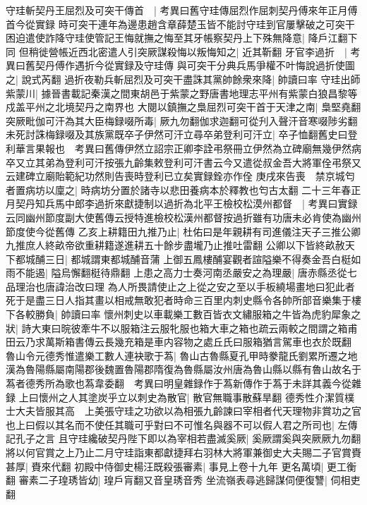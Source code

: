 守珪斬契丹王屈烈及可突干傳首　|{
	考異曰舊守珪傳屈烈作屈刺契丹傅來年正月傅首今從實録}
時可突干連年為邊患趙含章薛楚玉皆不能討守珪到官屢擊破之可突干困迫遣使詐降守珪使管記王悔就撫之悔至其牙帳察契丹上下殊無降意|{
	降戶江翻下同}
但稍徙營帳近西北密遣人引突厥謀殺悔以叛悔知之|{
	近其靳翻}
牙官李過折　|{
	考異曰舊契丹傅作遇折今從實録及守珪傳}
與可突干分典兵馬爭權不叶悔說過折使圖之|{
	說式芮翻}
過折夜勒兵斬屈烈及可突干盡誅其黨帥餘衆來降|{
	帥讀曰率}
守珪出師紫蒙川|{
	據晉書載記秦漢之間東胡邑于紫蒙之野唐書地理志平州有紫蒙白狼昌黎等戍盖平州之北境契丹之南界也}
大閱以鎮撫之梟屈烈可突干首于天津之南|{
	梟堅堯翻}
突厥毗伽可汗為其大臣梅録啜所毒|{
	厥九勿翻伽求迦翻可從刋入聲汗音寒啜陟劣翻}
未死討誅梅録啜及其族黨既卒子伊然可汗立尋卒弟登利可汗立|{
	卒子恤翻舊史曰登利華言果報也　考異曰舊傳伊然立詔宗正卿李詮弔祭冊立伊然為立碑廟無幾伊然病卒又立其弟為登利可汗按張九齡集敕登利可汗書云今又遣從叔金吾大將軍佺弔祭又云建碑立廟貽範紀功然則告喪時登利已立矣實録銓亦作佺}
庚戌來告喪　禁京城匄者置病坊以廩之|{
	時病坊分置於諸寺以悲田養病本於釋教也匄古太翻}
二十三年春正月契丹知兵馬中郎李過折來獻捷制以過折為北平王檢校松漠州都督　|{
	考異曰實録云同幽州節度副大使舊傳云授特進檢校松漢州都督按過折雖有功唐未必肯使為幽州節度使今從舊傳}
乙亥上耕籍田九推乃止|{
	杜佑曰是年親耕有司進儀注天子三推公卿九推庶人終畝帝欲重耕籍遂進耕五十餘步盡壠乃止推吐雷翻}
公卿以下皆終畝赦天下都城酺三日|{
	都城謂東都城酺音蒲}
上御五鳳樓酺宴觀者諠隘樂不得奏金吾白梃如雨不能遏|{
	隘烏懈翻梃待鼎翻}
上患之高力士奏河南丞嚴安之為理嚴|{
	唐赤縣丞從七品理治也唐諱治改曰理}
為人所畏請使止之上從之安之至以手板繞場畫地曰犯此者死于是盡三日人指其畫以相戒無敢犯者時命三百里内刺史縣令各帥所部音樂集于樓下各較勝負|{
	帥讀曰率}
懷州刺史以車載樂工數百皆衣文繡服箱之牛皆為虎豹犀象之狀|{
	詩大東曰晥彼牽牛不以服箱注云服牝服也箱大車之箱也疏云兩較之間謂之箱甫田云乃求萬斯箱書傳云長幾充箱是車内容物之處丘氏曰服箱猶言駕車也衣於既翻}
魯山令元德秀惟遣樂工數人連袂歌于蒍|{
	魯山古魯縣夏孔甲時豢龍氏劉累所遷之地漢為魯陽縣屬南陽郡後魏置魯陽郡隋復為魯縣屬汝州唐為魯山縣以縣有魯山故名于蒍者德秀所為歌也蒍韋委翻　考異曰明皇雜録作于蒍新傳作于蒍于未詳其義今從雜録}
上曰懷州之人其塗炭乎立以刺史為散官|{
	散官無職事散蘇旱翻}
德秀性介潔質樸士大夫皆服其高　上美張守珪之功欲以為相張九齡諫曰宰相者代天理物非賞功之官也上曰假以其名而不使任其職可乎對曰不可惟名與器不可以假人君之所司也|{
	左傳記孔子之言}
且守珪纔破契丹陛下即以為宰相若盡滅奚厥|{
	奚厥謂奚與突厥厥九勿翻}
將以何官賞之上乃止二月守珪詣東都獻捷拜右羽林大將軍兼御史大夫賜二子官賞賚甚厚|{
	賚來代翻}
初殿中侍御史楊汪既殺張審素|{
	事見上卷十九年}
更名萬頃|{
	更工衡翻}
審素二子瑝琇皆幼|{
	瑝戶肓翻又音皇琇音秀}
坐流嶺表尋逃歸謀伺便復讐|{
	伺相吏翻}
